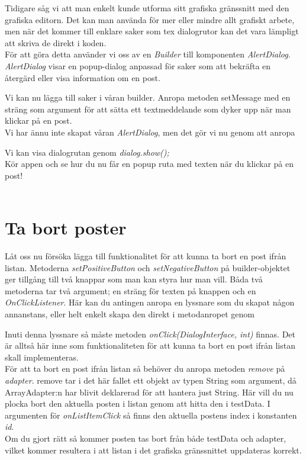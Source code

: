 \documentclass[11 pt, titlepage]{article} %
\begin{document}
Tidigare såg vi att man enkelt kunde utforma sitt grafiska gränssnitt med den grafiska editorn.
Det kan man använda för mer eller mindre allt grafiskt arbete, men när det kommer till enklare saker som tex dialogrutor kan det vara lämpligt att skriva de direkt i koden.\\

För att göra detta använder vi oss av en \textit{Builder} till komponenten \textit{AlertDialog}.
\textit{AlertDialog} visar en popup-dialog anpassad för saker som att bekräfta en återgärd eller visa information om en post.


Vi kan nu lägga till saker i våran builder.
Anropa metoden setMessage med en sträng som argument för att sätta ett textmeddelande som dyker upp när man klickar på en post.\\

Vi har ännu inte skapat våran \textit{AlertDialog}, men det gör vi nu genom att anropa

Vi kan visa dialogrutan genom \textit{dialog.show();}\\

Kör appen och se hur du nu får en popup ruta med texten när du klickar på en post!\\ \\

\section{Ta bort poster}
Låt oss nu försöka lägga till funktionalitet för att kunna ta bort en post ifrån listan.
Metoderna \textit{setPositiveButton} och \textit{setNegativeButton} på builder-objektet ger tillgång till två knappar som man kan styra hur man vill.
Båda två metoderna tar två argument; en sträng för texten på knappen och en \textit{OnClickListener}.
Här kan du antingen anropa en lyssnare som du skapat någon annanstans, eller helt enkelt skapa den direkt i metodanropet genom


Inuti denna lyssnare så måste metoden \textit{onClick(DialogInterface, int)} finnas. Det är alltså här inne som funktionaliteten för att kunna ta bort en post ifrån listan skall implementeras.\\

För att ta bort en post ifrån listan så behöver du anropa metoden \textit{remove} på \textit{adapter}.
remove tar i det här fallet ett objekt av typen String som argument, då ArrayAdapter:n har blivit deklarerad för att hantera just String.
Här vill du nu plocka bort den aktuella posten i listan genom att hitta den i testData.
I argumenten för \textit{onListItemClick} så finns den aktuella postens index i konstanten \textit{id}.\\ %
Om du gjort rätt så kommer posten tas bort från både testData och adapter, vilket kommer resultera i att listan i det grafiska gränssnittet uppdateras korrekt.\\
\end{document}
